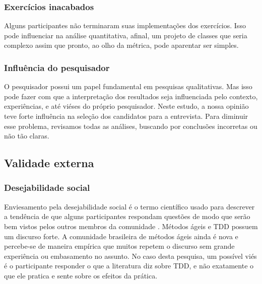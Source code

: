 \documentclass[conference]{IEEEtran}
\begin{document}
\subsubsection{Exercícios inacabados}

Alguns participantes não terminaram suas implementações dos exercícios. Isso
pode influenciar na análise quantitativa, afinal, um projeto de classes que
seria complexo assim que pronto, ao olho da métrica, pode aparentar ser simples.

\subsubsection{Influência do pesquisador}

O pesquisador possui
um papel fundamental em pesquisas qualitativas. Mas isso pode fazer com que
a interpretação dos resultados seja influenciada pelo contexto, experiências,
e até viéses do próprio pesquisador.
Neste estudo, a nossa opinião teve forte influência na seleção dos candidatos
para a entrevista.
Para diminuir esse problema, revisamos todas as análises,
buscando por conclusões incorretas ou não tão claras. 

\subsection{Validade externa}

\subsubsection{Desejabilidade social}

Enviesamento pela desejabilidade social é o termo científico usado para descrever
a tendência de que alguns participantes respondam questões de modo que serão
bem vistos pelos outros membros da comunidade \cite{crowne}.
Métodos ágeis e TDD possuem um discurso forte. A comunidade brasileira de métodos
ágeis ainda é nova e percebe-se de maneira empírica que muitos repetem o discurso
sem grande experiência ou embasamento no assunto.
No caso desta pesquisa, um possível viés é o participante responder o que
a literatura diz sobre TDD, e não exatamente o que ele pratica e sente sobre
os efeitos da prática. 
\end{document}
